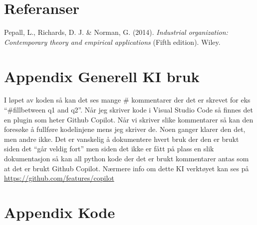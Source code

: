 \documentclass[
  12pt,
  a4paper,
  DIV=11,
  numbers=noendperiod]{scrartcl}
\newlength{\cslhangindent}
\newenvironment{CSLReferences}[2] %
 {\begin{list}{}{%
  \setlength{\itemindent}{0pt}
  \setlength{\leftmargin}{0pt}
  \setlength{\parsep}{0pt}
  \ifodd #1
   \setlength{\leftmargin}{\cslhangindent}
   \setlength{\itemindent}{-1\cslhangindent}
  \fi
  \setlength{\itemsep}{#2\baselineskip}}}
 {\end{list}}
\begin{document}
\clearpage

\section{Referanser}\label{referanser}

\label{refs}
\begin{CSLReferences}{1}{0}
Pepall, L., Richards, D. J. \& Norman, G. (2014). \emph{Industrial
organization: Contemporary theory and empirical applications} (Fifth
edition). Wiley.

\end{CSLReferences}

\clearpage

\appendix

\section {Appendix Generell KI bruk}

I løpet av koden så kan det ses mange \# kommentarer der det er skrevet
for eks ``\#fillbetween q1 and q2''. Når jeg skriver kode i Visual
Studio Code så finnes det en plugin som heter Github Copilot. Når vi
skriver slike kommentarer så kan den foresøke å fullføre kodelinjene
mens jeg skriver de. Noen ganger klarer den det, men andre ikke. Det er
vanskelig å dokumentere hvert bruk der den er brukt siden det ``går
veldig fort'' men siden det ikke er fått på plass en slik dokumentasjon
så kan all python kode der det er brukt kommentarer antas som at det er
brukt Github Copilot. Nærmere info om dette KI verktøyet kan ses på
\url{https://github.com/features/copilot}

\clearpage

\section {Appendix Kode}
\end{document}
